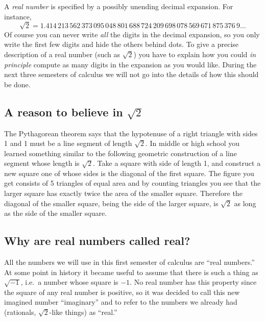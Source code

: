 A \emph{real number} is specified by a possibly unending decimal
expansion.  For instance,
\[
\sqrt 2 = 1.414\,213\,562\,373\,095\,048\,801\,688\,724\,
209\,698\,078\,569\,671\,875\,376\,9\dots
\]
Of course you can never write \textit{all} the digits in the decimal expansion,
so you only write the first few digits and hide the others behind dots. To
give a precise description of a real number (such as $\sqrt2$) you have to
explain how you could \textit{in principle} compute as many digits in the
expansion as you would like.  During the next three
semesters of calculus we will not go into the details of how this should be
done.

\subsection{A reason to believe in $\sqrt2$}
The Pythagorean theorem says that the hypotenuse of a right triangle with sides
1 and 1 must be a line segment of length $\sqrt2$.
In middle or high school you learned something similar to the following geometric
construction of a line segment whose length is $\sqrt2$.  Take a square with
side of length 1, and construct a new square one of whose sides is the diagonal
of the first square.  The figure you get consists of 5 triangles of equal area
and by counting triangles you see that the larger square  has exactly twice the
area of the smaller square.
Therefore the diagonal of the smaller square, being
the side of the larger square, is $\sqrt2$ as long as the side of the smaller
square. 



\subsection{Why are real numbers called real? }
All the numbers we will use in this first semester of calculus are ``real
numbers.'' At some point in history it became useful to assume that there
is such a thing as $\sqrt{-1}$, i.e.~a number whose square is $-1$.  No
real number has this property since the square of any real number is
positive, so it was decided to call this new imagined number ``imaginary''
and to refer to the numbers we already had (rationals, $\sqrt2$-like
things) as ``real.''

